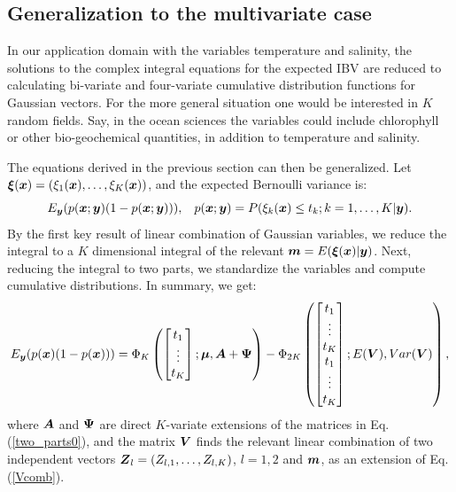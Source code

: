 \documentclass[aoas]{imsart}
\begin{document}
\subsection{Generalization to the multivariate case}
\label{gen_k}

In our application domain with the variables temperature and salinity,
the solutions to the complex integral equations for the expected IBV
are reduced to calculating bi-variate and four-variate cumulative
distribution functions for Gaussian vectors. For the more general
situation one would be interested in $K$ random fields. Say, in the
ocean sciences the variables could include chlorophyll or other
bio-geochemical quantities, in addition to temperature and salinity.

The equations derived in the previous section can then be generalized. Let
${\boldsymbol \xi}({\boldsymbol x})=(\xi_1({\boldsymbol x}),\ldots,\xi_K({\boldsymbol x}))$, and the expected Bernoulli
variance is:
\begin{equation}\label{two_partsK}
E_{\by}(p(\bx;\by)(1-p(\bx;\by))), \hspace{3mm} p(\bx;\by)=P(\xi_k(\bx) \leq t_k ; k=1,\ldots,K|\by). 
\end{equation}
By the first key result of linear combination of Gaussian variables,
we reduce the integral to a $K$ dimensional integral of the relevant
${\boldsymbol m}=E({\boldsymbol \xi}({\boldsymbol x})|{\boldsymbol y})$. Next, reducing the integral to two parts, we
standardize the variables and compute cumulative distributions.  In
summary, we get:
\begin{equation}\label{two_parts}
E_{\by}(p(\bx)(1-p(\bx))) =  \Phi_K 
\begin{pmatrix}
\begin{bmatrix} t_1\\
\vdots \\
t_K 
\end{bmatrix};
\bmu,\bA+\bPsi 
\end{pmatrix}
- \Phi_{2K} 
\begin{pmatrix}
\begin{bmatrix} t_1\\
\vdots \\
t_K \\
t_1\\
\vdots \\
t_K 
\end{bmatrix};
E(\bV),Var(\bV) 
\end{pmatrix},\nonumber
\end{equation}
where ${\boldsymbol A}$ and ${\boldsymbol \Psi}$ are direct $K$-variate extensions of the
matrices in Eq. (\ref{two_parts0}), and the matrix ${\boldsymbol V}$ finds the
relevant linear combination of two independent vectors
${\boldsymbol Z}_l=(Z_{l,1},\ldots,Z_{l,K})$, $l=1,2$ and ${\boldsymbol m}$, as an extension
of Eq. (\ref{Vcomb}).
\end{document}
